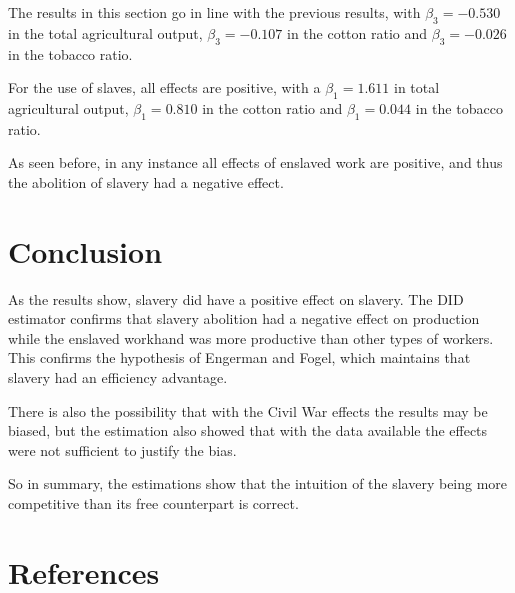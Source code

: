 \documentclass[11pt]{beamer}
\begin{document}
\begin{frame}
The results in this section go in line with the previous results, with $\beta_{3}=-0.530$ in the total agricultural output, $\beta_{3}=-0.107$ in the cotton ratio and $\beta_{3}=-0.026$ in the tobacco ratio.

\vspace{\baselineskip}
For the use of slaves, all effects are positive, with a $\beta_{1}=1.611$ in total agricultural output, $\beta_{1}=0.810$ in the cotton ratio and $\beta_{1}=0.044$ in the tobacco ratio.

\vspace{\baselineskip}
As seen before, in any instance all effects of enslaved work are positive, and thus the abolition of slavery had a negative effect.
\end{frame}

\section{Conclusion}
\begin{frame}
As the results show, slavery did have a positive effect on slavery. The DID estimator confirms that slavery abolition had a negative effect on production while the enslaved workhand was more productive than other types of workers. This confirms the hypothesis of Engerman and Fogel, which maintains that slavery had an efficiency advantage.

There is also the possibility that with the Civil War effects the results may be biased, but the estimation also showed that with the data available the effects were not sufficient to justify the bias.

So in summary, the estimations show that the intuition of the slavery being more competitive than its free counterpart is correct.
\end{frame}

\section{References}
\begin{frame}[allowframebreaks]
\nocite{*}
\printbibliography
\end{frame}
\end{document}
